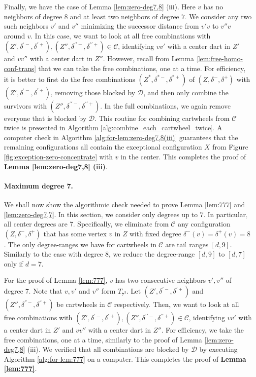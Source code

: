 \documentclass[10pt,a4paper]{article}
\def\cD{{\mathcal D}}
\def\cC{{\mathcal C}}
\def\Tseven{{T_{7^3}}}
\begin{document}
Finally, we have the case of Lemma \ref{lem:zero-deg7,8} (iii). Here $v$ has no neighbors of degree 8 and at least two neighbors of degree $7$. We consider any two such neighbors $v'$ and $v''$ minimizing the successor distance from $v'v$ to $v''v$ around $v$. In this case, 
we want to look at all free combinations with 
$(Z',\delta^{\prime -},\delta^{\prime+}),(Z'',\delta^{\prime\prime -},\delta^{\prime\prime+})\in\cC$, identifying $vv'$ with a center dart in $Z'$ and $vv''$ with a center dart in $Z''$. However,
recall from Lemma \ref{lem:free-homo-conf-trans} that we can take the free combinations, one at a time. For efficiency, it is better to first do the
free combinations $(Z^*,\delta^{*-},\delta^{*+})$ of $(Z,\delta^- ,\delta^+)$ with $(Z',\delta^{\prime -},\delta^{\prime+})$, removing those blocked by $\cD$, and then only combine the survivors with $(Z'',\delta^{\prime\prime-},\delta^{\prime\prime+})$.
In the full combinations, we again remove everyone that is blocked by $\cD$.
This routine for combining cartwheels from $\mathcal{C}$ twice is presented in Algorithm \ref{alg:combine_each_cartwheel_twice}.
A computer check in Algorithm \ref{alg:for-lem:zero-deg7,8(iii)} guarantees that the remaining configurations all contain
the exceptional configuration $X$ from Figure \ref{fig:exception-zero-concentrate} with $v$ in the center. This completes the proof of
{\bf Lemma \ref{lem:zero-deg7,8} (iii)}.



\paragraph{Maximum degree 7.}
We shall now show the algorithmic check needed to prove Lemma \ref{lem:777} and \ref{lem:zero-deg7,7}.
In this section, we consider only degrees up to $7$. In particular, all center degrees are 7.
Specifically, we eliminate from $\mathcal{C}$ any configuration $(Z, \delta^-, \delta^+)$ that has some vertex $v$ in $Z$ with fixed degree $\delta^-(v)=\delta^+(v)=8$.
The only degree-ranges we have for cartwheels in $\mathcal{C}$ are tail ranges $[d,9]$.
Similarly to the case with degree $8$,
we reduce the degree-range 
$[d,9]$ to $[d,7]$ only if $d=7$.

For the proof of Lemma \ref{lem:777}, $v$ has two consecutive neighbors $v', v''$ of degree $7$.
Note that $v,v'$ and $v''$ form $\Tseven$.
Let $(Z', \delta^{'-}, \delta^{'+})$ and $(Z'', \delta^{''-}, \delta^{''+})$ be cartwheels in $\mathcal{C}$ respectively.
Then, we want to look at all free combinations with
$(Z', \delta^{\prime-}, \delta^{\prime+}), (Z'', \delta^{\prime\prime-}, \delta^{\prime\prime+}) \in \mathcal{C}$, identifying $vv'$ with a center dart in $Z'$ and $vv''$ with a center dart in $Z''$.
For efficiency, we take the free combinations, one at a time, similarly to the proof of Lemma \ref{lem:zero-deg7,8} (iii).
We verified that all combinations are blocked by $\mathcal{D}$ by executing Algorithm \ref{alg:for-lem:777} on a computer. 
This completes the proof of \textbf{Lemma \ref{lem:777}}.
\end{document}
